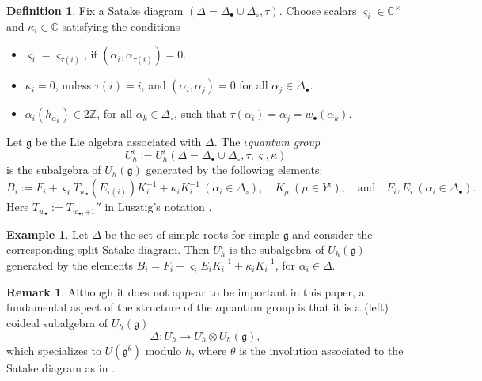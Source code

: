 \documentclass[10pt]{amsart}
\numberwithin{equation}{section}
\theoremstyle{definition}
\newtheorem{remark}[theorem]{Remark}
\newtheorem{definition}[theorem]{Definition}
\newtheorem{example}[theorem]{Example}
\def\C{{\mathbb C}}
\newcommand{\ot}{\otimes}
\newcommand{\g}{\mathfrak{g}}
\begin{document}
\begin{definition}\label{iQuantumgroup}
    Fix a Satake diagram $(\Delta=\Delta_{\bullet}\cup\Delta_{\circ}, \tau)$. Choose scalars $\varsigma_i\in \C^{\times}$ and $\kappa_i\in \C$ satisfying the conditions
    \begin{itemize}
        \item $\varsigma_i=\varsigma_{\tau(i)}$, if $(\alpha_i,\alpha_{\tau(i)})=0$. 
        \item $\kappa_i=0$, unless $\tau(i) =i$, and $(\alpha_i,\alpha_j)=0$ for all $\alpha_j\in \Delta_{\bullet}$.
        \item $\alpha_i(h_{\alpha_k})\in2\mathbb{Z}$, for all $\alpha_k\in \Delta_{\circ}$, such that $\tau(\alpha_i) = \alpha_j= w_{\bullet}(\alpha_k)$.
    \end{itemize}
    Let $\mathfrak{g}$ be the Lie algebra associated with $\Delta$. The \emph{$\iota$quantum group} 
    \[
    U_h^{\iota}:=U^{\iota}_{h}(\Delta=\Delta_{\bullet} \cup \Delta_{\circ}, \tau,\varsigma,\kappa)
    \]
    is the subalgebra of $U_{h}(\mathfrak{g})$ generated by the following elements:
    \begin{equation*}
        B_i:= F_i +\varsigma_i T_{w_{\bullet}}(E_{\tau(i)})K_i^{-1} + \kappa_i K_i^{-1} \ (\alpha_i\in \Delta_{\circ}), \quad K_{\mu} \ (\mu\in Y^{\iota}),\quad  \text{and} \quad F_i,E_i \ (\alpha_i\in \Delta_{\bullet}).
    \end{equation*}
    Here $T_{w_{\bullet}}:=T_{w_{\bullet},+1}''$ in Lusztig's notation \cite{Lus4}.
\end{definition}

\begin{example}
    Let $\Delta$ be the set of simple roots for simple $\g$ and consider the corresponding split Satake diagram. Then $U_h^{\iota}$ is the subalgebra of $U_h(\g)$ generated by the elements $B_i=F_i+ \varsigma_iE_iK_i^{-1}+ \kappa_iK_i^{-1}$, for $\alpha_i\in \Delta$.
\end{example}

\begin{remark}
    Although it does not appear to be important in this paper, a fundamental aspect of the structure of the $\iota$quantum group is that it is a (left) coideal subalgebra of $U_{h}(\mathfrak{g})$
    \[
    \Delta: U^{\iota}_{h} \longrightarrow U^{\iota}_{h} \ot U_h(\mathfrak{g}),
    \]
    which specializes to $U(\mathfrak{g}^{\theta})$ modulo $h$, where $\theta$ is the involution associated to the Satake diagram as in \cite[Theorem 2.5]{MR3269184}.
\end{remark}
\end{document}
